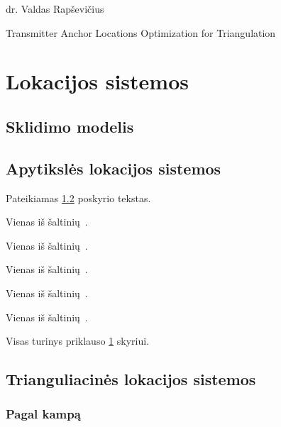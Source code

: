 \documentclass[a4paper,12pt,fleqn]{article}
\begin{document}
 {}{}{}{}%
 {dr. Valdas Rapševičius}

\tableofcontents

\iffalse
\sectionWithoutNumber{Sutartinis terminų žodynas}{keywords}{Pateikiamas terminų sąrašas (jei reikia)}
\fi

\bothabstracts{}%
{Transmitter Anchor Locations Optimization for Triangulation} %
{}%






\newpage
\section{Lokacijos sistemos}
\label{sec:motivation}
\subsection{Sklidimo modelis}
\subsection{Apytikslės lokacijos sistemos}
\label{sec:example}
Pateikiamas \ref{sec:example} poskyrio tekstas.

Vienas iš šaltinių~\cite{L1}.

Vienas iš šaltinių~\cite{L2}.

Vienas iš šaltinių~\cite{L3}.

Vienas iš šaltinių~\cite{L4}.
 
Vienas iš šaltinių~\cite{L5}.

Visas turinys priklauso \ref{sec:motivation} skyriui.

\subsection{Trianguliacinės lokacijos sistemos}
\subsubsection{Pagal kampą}
\end{document}
